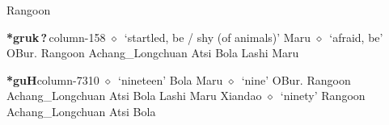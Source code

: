          Rangoon 
  \item {\footnotesize \textbf{*gruk\,?\,}}{\tiny column-158}
         $\diamond$~`startled, be / shy (of animals)'
         Maru 
\hspace{1ex}
         $\diamond$~`afraid, be'
         OBur. 
\hspace{1ex}
         Rangoon 
\hspace{1ex}
         Achang\_Longchuan 
\hspace{1ex}
         Atsi 
\hspace{1ex}
         Bola 
\hspace{1ex}
         Lashi 
\hspace{1ex}
         Maru 
  \item {\footnotesize \textbf{*guH}}{\tiny column-7310}
         $\diamond$~`nineteen'
         Bola 
\hspace{1ex}
         Maru 
\hspace{1ex}
         $\diamond$~`nine'
         OBur. 
\hspace{1ex}
         Rangoon 
\hspace{1ex}
         Achang\_Longchuan 
\hspace{1ex}
         Atsi 
\hspace{1ex}
         Bola 
\hspace{1ex}
         Lashi 
\hspace{1ex}
         Maru 
\hspace{1ex}
         Xiandao 
\hspace{1ex}
         $\diamond$~`ninety'
         Rangoon 
\hspace{1ex}
         Achang\_Longchuan 
\hspace{1ex}
         Atsi 
\hspace{1ex}
         Bola 
\hspace{1ex}
